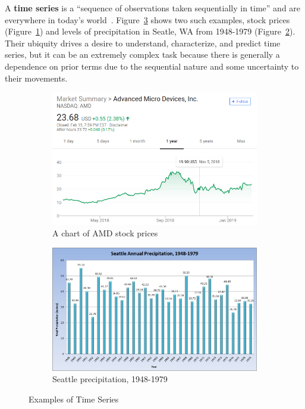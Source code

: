 \documentclass[oneside,12pt,openany]{book}
\begin{document}
	A \textbf{time series} is a ``sequence of observations taken sequentially in time'' and are everywhere in today's world~\cite{Box}. Figure~\ref{fig:TimeSeriesExamples} shows two such examples, stock prices (Figure~\ref{fig:AMDChart}) and levels of precipitation in Seatle, WA from 1948-1979 (Figure~\ref{fig:SeattlePrecip}). Their ubiquity drives a desire to understand, characterize, and predict time series, but it can be an extremely complex task because there is generally a dependence on prior terms due to the sequential nature and some uncertainty to their movements.
	
	\begin{figure}[hbt!]
		\centering
		\begin{subfigure}[b]{.45\textwidth}
			\includegraphics[width=\textwidth]{images/AMDChart.png}
			\caption{A chart of AMD stock prices}
			\label{fig:AMDChart}
		\end{subfigure}
		\begin{subfigure}[b]{.45\textwidth}
			\includegraphics[width=\textwidth]{images/SeattleRainfall.png}
			\caption{Seattle precipitation, 1948-1979}
			\label{fig:SeattlePrecip}
		\end{subfigure}
		\caption[Examples of Time Series]{Examples of Time Series \footnotemark}
		\label{fig:TimeSeriesExamples}
			
	\end{figure}
\end{document}
